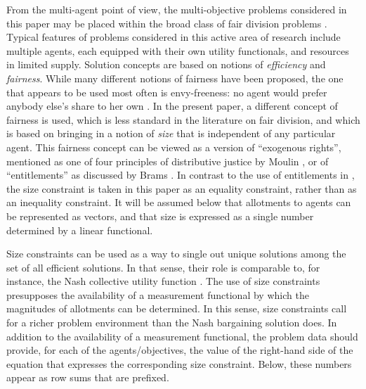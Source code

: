 \documentclass{article}
\theoremstyle{definition}
\begin{document}
From the multi-agent point of view, the multi-objective problems considered in this paper may be placed within the broad class of fair division problems \cite{Brams,Moulin}. Typical features of problems considered in this active area of research include multiple agents, each equipped with their own utility functionals, and resources in limited supply. Solution concepts are based on notions of \emph{efficiency} and \emph{fairness}. While many different notions of fairness have been proposed, the one that appears to be used most often is envy-freeness: no agent would prefer anybody else's share to her own \cite{Foley}. In the present paper, a different concept of fairness is used, which is less standard in the literature on fair division, and which is based on bringing in a notion of \emph{size} that is independent of any particular agent. This fairness concept can be viewed as a version of ``exogenous rights''\!, mentioned as one of four principles of distributive justice by Moulin \cite[Ch.\,2]{Moulin}, or of ``entitlements'' as discussed by Brams \cite{Brams}. In contrast to the use of entitlements in \cite{Brams}, the size constraint is taken in this paper as an equality constraint, rather than as an inequality constraint. It will be assumed below that allotments to agents can be represented as vectors, and that size is expressed as a single number determined by a linear functional.

Size constraints can be used as a way to single out unique solutions among the set of all efficient solutions. In that sense, their role is comparable to, for instance, the Nash collective utility function \cite{Nash}. The use of size constraints presupposes the availability of a measurement functional by which the magnitudes of allotments can be determined. In this sense, size constraints call for a richer problem environment than the Nash bargaining solution does. In addition to the availability of a measurement functional, the problem data should provide, for each of the agents/objectives, the value of the right-hand side of the equation that expresses the corresponding size constraint. Below, these numbers appear as row sums that are prefixed.
\end{document}

